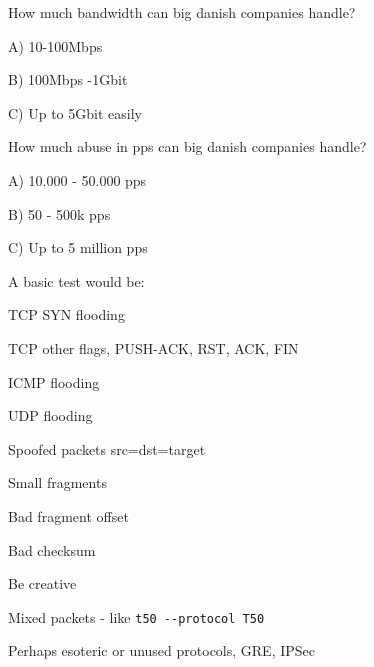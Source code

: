 \documentclass[Screen16to9,17pt]{foils}
\begin{document}

How much bandwidth can big danish companies handle?
\begin{list2}
\item A) 10-100Mbps
\item B) 100Mbps -1Gbit
\item C) Up to 5Gbit easily
\end{list2}

How much abuse in pps can big danish companies handle?
\begin{list2}
\item A) 10.000 - 50.000 pps
\item B) 50 - 500k pps
\item C) Up to 5 million pps
\end{list2}


A basic test would be:
\begin{list2}
\item TCP SYN flooding
\item TCP other flags, PUSH-ACK, RST, ACK, FIN
\item ICMP flooding
\item UDP flooding
\item Spoofed packets src=dst=target \smiley
\item Small fragments
\item Bad fragment offset
\item Bad checksum
\item Be creative
\item Mixed packets - like \verb+t50 --protocol T50+
\item Perhaps esoteric or unused protocols, GRE, IPSec
\end{list2}

\end{document}
